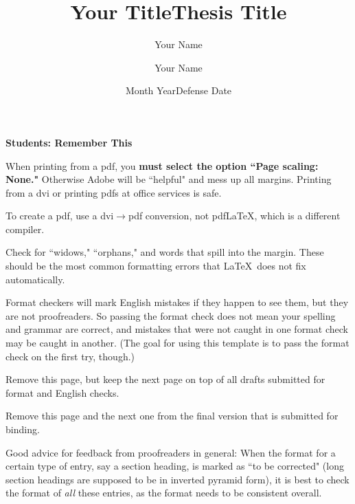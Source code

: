 \documentclass[12pt]{report}
\title{Your Title}
\author{Your Name}
\date{Month Year}
\title{Thesis Title}
\author{Your Name}
\date{Defense Date}
\renewenvironment{itemize}{%
\vspace{-.15in} %
    \begin{olditemize}%
\setlength{\parsep}{0ex}
\setlength{\topsep}{0ex}
\setlength{\partopsep}{0ex}
      \setlength{\parskip}{0pt}%
      \setlength{\itemsep}{0pt}%
  }%
  {%
    \end{olditemize}%
  }
\numberwithin{equation}{chapter}
\begin{document}
\thispagestyle{empty}


\begin{singlespace}

\centerline{\bf \Large Students: Remember This}



\begin{itemize}
\item
When printing from a pdf, you {\bf must select the option
``Page scaling: None."} Otherwise Adobe will be ``helpful" and
mess up all margins. Printing from a dvi or printing pdfs
at office services is safe.

\item
To create a pdf, use a dvi$\to $pdf conversion, not pdf\LaTeX, which is a
different compiler.


\item
Check for ``widows," ``orphans," and words that spill into the margin.
These should be the most common formatting errors that \LaTeX \
does not fix automatically.

\item
Format checkers will mark English mistakes if they happen to see them,
but they are not proofreaders. So passing the format check does not
mean your spelling and grammar are correct, and mistakes that were
not caught in one format check may be caught in another.
(The goal for using this template is to
pass the format check on the first try, though.)

\item
Remove this page, but keep the next
page on top of all drafts submitted for
format and English checks.

\item
Remove this page and the next one from the final version
that is submitted for binding.


\end{itemize}


Good advice for feedback from proofreaders in general:
When the format for a certain type of entry, say a section heading,
is marked as ``to be corrected" (long section headings are supposed
to be in inverted pyramid form), it is best to
check the format of {\em all} these entries, as
the format needs to be
consistent overall.


\end{singlespace}




\clearpage

\thispagestyle{empty}
\end{document}
